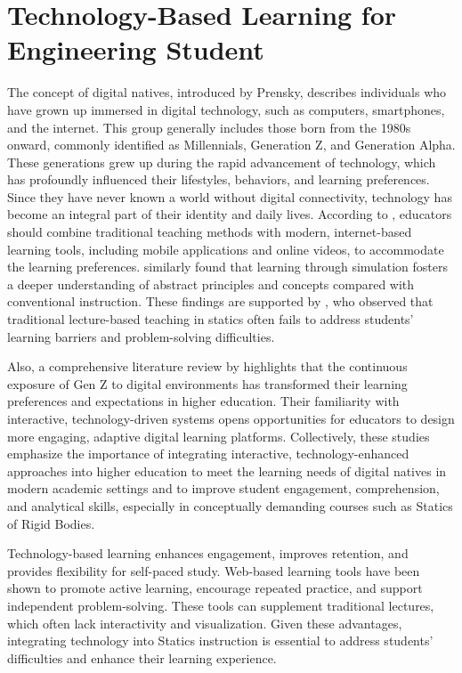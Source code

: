 
\section{Technology-Based Learning for Engineering Student}

The concept of digital natives, introduced by Prensky, describes individuals who have grown up immersed in digital technology, such as computers, smartphones, and the internet. This group generally includes those born from the 1980s onward, commonly identified as Millennials, Generation Z, and Generation Alpha. These generations grew up during the rapid advancement of technology, which has profoundly influenced their lifestyles, behaviors, and learning preferences. Since they have never known a world without digital connectivity, technology has become an integral part of their identity and daily lives. According to \cite{szymkowiak_information_2021}, educators should combine traditional teaching methods with modern, internet-based learning tools, including mobile applications and online videos, to accommodate the learning preferences. \cite{zeichner_using_2020} similarly found that learning through simulation fosters a deeper understanding of abstract principles and concepts compared with conventional instruction. These findings are supported by \cite{de_la_hoz_self-explanation_2023}, who observed that traditional lecture-based teaching in statics often fails to address students’ learning barriers and problem-solving difficulties. 

Also, a comprehensive literature review by \cite{tawafak_innovative_2021} highlights that the continuous exposure of Gen Z to digital environments has transformed their learning preferences and expectations in higher education. Their familiarity with interactive, technology-driven systems opens opportunities for educators to design more engaging, adaptive digital learning platforms. Collectively, these studies emphasize the importance of integrating interactive, technology-enhanced approaches into higher education to meet the learning needs of digital natives in modern academic settings and to improve student engagement, comprehension, and analytical skills, especially in conceptually demanding courses such as Statics of Rigid Bodies.

Technology-based learning enhances engagement, improves retention, and provides flexibility for self-paced study. Web-based learning tools have been shown to promote active learning, encourage repeated practice, and support independent problem-solving. These tools can supplement traditional lectures, which often lack interactivity and visualization. Given these advantages, integrating technology into Statics instruction is essential to address students’ difficulties and enhance their learning experience.

